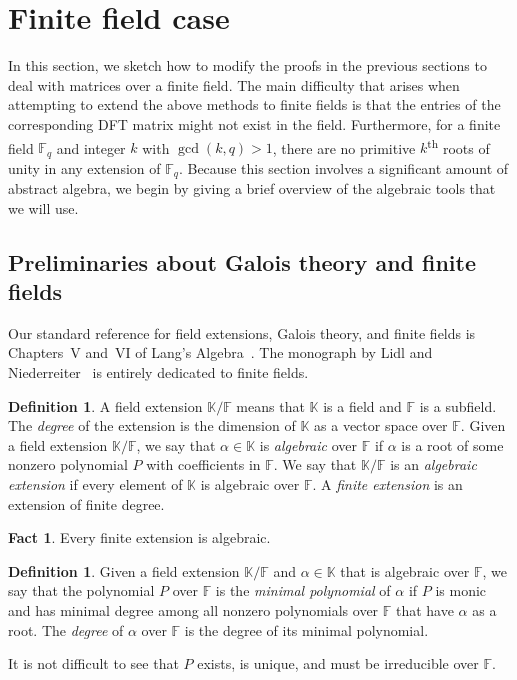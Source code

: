 \documentclass[11pt]{article}
\numberwithin{equation}{section}
\theoremstyle{definition}
\theoremstyle{plain}
\theoremstyle{definition}
\newtheorem{define}[theorem]{Definition}
\newtheorem{fact.}[theorem]{Fact}
\newcommand\F{{\mathbb{F}}}
\newcommand\K{{\mathbb{K}}}
\newcommand{\ts}{\textsuperscript}
\begin{document}
%
%
%

%
\section{Finite field case}\label{sec_finitefield}  %
In this section, we sketch how to modify the proofs in the previous sections to deal with matrices over a finite field.  The main difficulty that arises when attempting to extend the above methods to finite fields is that the entries of the corresponding %
DFT %
 matrix might not exist in the field.  Furthermore, for a finite field $\F_q$ and integer $k$ with $\gcd(k,q) > 1$, there are no primitive $k$\ts{th} roots of unity %
in %
any extension of $\F_q$.  Because this section involves a significant amount of abstract algebra, we begin by giving a brief overview of the algebraic tools that we will use.

%
%
%
%

%
\subsection{Preliminaries about Galois theory and finite fields}
\label{sec:galois}
%
Our standard reference for field extensions, Galois theory,
and finite fields is Chapters~V and~VI of
Lang's Algebra~\cite{lang}.  The monograph by
Lidl and Niederreiter~\cite{lidl} is entirely dedicated  %
to finite fields.

\begin{define}
A field extension $\K/\F$ means that $\K$ is a field and $\F$ is
a subfield.  The \emph{degree} of the extension is the dimension
of $\K$ as a vector space over $\F$.  Given a field extension $\K/\F$,
we say that $\alpha \in \K$ is \emph{algebraic} over $\F$ if $\alpha$
is a root of some nonzero polynomial $P$ with coefficients in $\F$.
We say that $\K/\F$ is an \emph{algebraic extension} if every
element of $\K$ is algebraic over $\F$.  A \emph{finite extension}
is an extension of finite degree. 
\end{define}

\begin{fact.}
Every finite extension is algebraic.
\end{fact.}

\begin{define}
Given a field extension $\K/\F$ and $\alpha \in \K$ that is
algebraic over $\F$, we say that the polynomial $P$
over $\F$ is the \emph{minimal polynomial} of $\alpha$
if $P$ is monic and has minimal degree among all nonzero
polynomials over $\F$ that have $\alpha$ as a root.
The \emph{degree} of $\alpha$ over $\F$ is the degree of its
minimal polynomial.
\end{define}
It is not difficult to see that $P$ exists, is
unique, and must be irreducible over $\F$.
\end{document}
